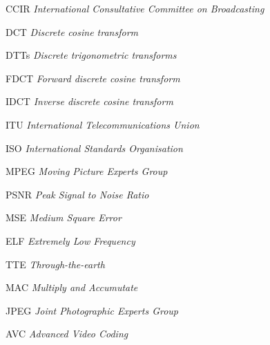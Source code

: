 \begin{siglas}
  \item[CCIR] \textit{International Consultative Committee on Broadcasting}
  \item[DCT] \textit{Discrete cosine transform}
  \item[DTTs] \textit{Discrete trigonometric transforms}
  \item[FDCT] \textit{Forward discrete cosine transform} 
  \item[IDCT] \textit{Inverse discrete cosine transform} 
  \item[ITU] \textit{International Telecommunications Union}
  \item[ISO] \textit{International Standards Organisation}
  \item[MPEG] \textit{Moving Picture Experts Group}
  \item[PSNR] \textit{Peak Signal to Noise Ratio}
  \item[MSE] \textit{Medium Square Error}
  \item[ELF] \textit{Extremely Low Frequency}
  \item[TTE] \textit{Through-the-earth}
  \item[MAC] \textit{Multiply and Accumutate}
  \item[JPEG] \textit{Joint Photographic Experts Group}
  \item[AVC] \textit{Advanced Video Coding}
\end{siglas}
